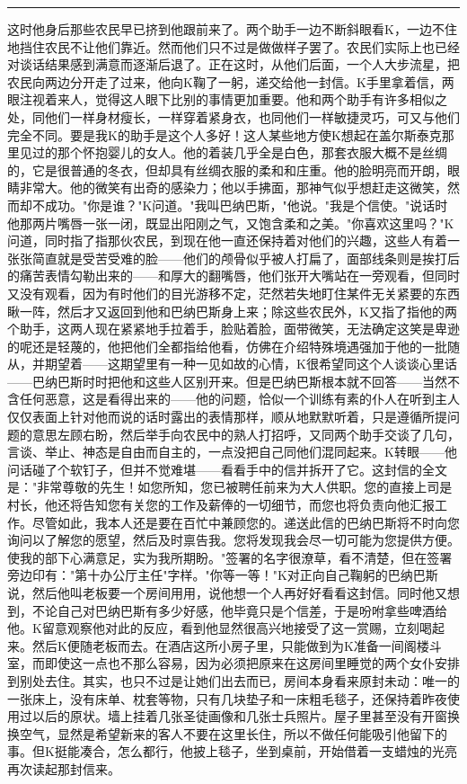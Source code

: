 \documentclass[12pt,a4paper]{article}
\begin{document}
\noindent\rule{\textwidth}{0.4pt}

\vspace{0.3em}



这时他身后那些农民早已挤到他跟前来了。两个助手一边不断斜眼看K，一边不住地挡住农民不让他们靠近。然而他们只不过是做做样子罢了。农民们实际上也已经对谈话结果感到满意而逐渐后退了。正在这时，从他们后面，一个人大步流星，把农民向两边分开走了过来，他向K鞠了一躬，递交给他一封信。K手里拿着信，两眼注视着来人，觉得这人眼下比别的事情更加重要。他和两个助手有许多相似之处，同他们一样身材瘦长，一样穿着紧身衣，也同他们一样敏捷灵巧，可又与他们完全不同。要是我K的助手是这个人多好！这人某些地方使K想起在盖尔斯泰克那里见过的那个怀抱婴儿的女人。他的着装几乎全是白色，那套衣服大概不是丝绸的，它是很普通的冬衣，但却具有丝绸衣服的柔和和庄重。他的脸明亮而开朗，眼睛非常大。他的微笑有出奇的感染力；他以手拂面，那神气似乎想赶走这微笑，然而却不成功。"你是谁？"K问道。"我叫巴纳巴斯，"他说。"我是个信使。"说话时他那两片嘴唇一张一闭，既显出阳刚之气，又饱含柔和之美。"你喜欢这里吗？"K问道，同时指了指那伙农民，到现在他一直还保持着对他们的兴趣，这些人有着一张张简直就是受苦受难的脸——他们的颅骨似乎被人打扁了，面部线条则是挨打后的痛苦表情勾勒出来的——和厚大的翻嘴唇，他们张开大嘴站在一旁观看，但同时又没有观看，因为有时他们的目光游移不定，茫然若失地盯住某件无关紧要的东西瞅一阵，然后才又返回到他和巴纳巴斯身上来；除这些农民外，K又指了指他的两个助手，这两人现在紧紧地手拉着手，脸贴着脸，面带微笑，无法确定这笑是卑逊的呢还是轻蔑的，他把他们全都指给他看，仿佛在介绍特殊境遇强加于他的一批随从，并期望着——这期望里有一种一见如故的心情，K很希望同这个人谈谈心里话——巴纳巴斯时时把他和这些人区别开来。但是巴纳巴斯根本就不回答——当然不含任何恶意，这是看得出来的——他的问题，恰似一个训练有素的仆人在听到主人仅仅表面上针对他而说的话时露出的表情那样，顺从地默默听着，只是遵循所提问题的意思左顾右盼，然后举手向农民中的熟人打招呼，又同两个助手交谈了几句，言谈、举止、神态是自由而自主的，一点没把自己同他们混同起来。K转眼——他问话碰了个软钉子，但并不觉难堪——看看手中的信并拆开了它。这封信的全文是："非常尊敬的先生！如您所知，您已被聘任前来为大人供职。您的直接上司是村长，他还将告知您有关您的工作及薪俸的一切细节，而您也将负责向他汇报工作。尽管如此，我本人还是要在百忙中兼顾您的。递送此信的巴纳巴斯将不时向您询问以了解您的愿望，然后及时禀告我。您将发现我会尽一切可能为您提供方便。使我的部下心满意足，实为我所期盼。"签署的名字很潦草，看不清楚，但在签署旁边印有："第十办公厅主任"字样。"你等一等！"K对正向自己鞠躬的巴纳巴斯说，然后他叫老板要一个房间用用，说他想一个人再好好看看这封信。同时他又想到，不论自己对巴纳巴斯有多少好感，他毕竟只是个信差，于是吩咐拿些啤酒给他。K留意观察他对此的反应，看到他显然很高兴地接受了这一赏赐，立刻喝起来。然后K便随老板而去。在酒店这所小房子里，只能做到为K准备一间阁楼斗室，而即使这一点也不那么容易，因为必须把原来在这房间里睡觉的两个女仆安排到别处去住。其实，也只不过是让她们出去而已，房间本身看来原封未动：唯一的一张床上，没有床单、枕套等物，只有几块垫子和一床粗毛毯子，还保持着昨夜使用过以后的原状。墙上挂着几张圣徒画像和几张士兵照片。屋子里甚至没有开窗换换空气，显然是希望新来的客人不要在这里长住，所以不做任何能吸引他留下的事。但K挺能凑合，怎么都行，他披上毯子，坐到桌前，开始借着一支蜡烛的光亮再次读起那封信来。
\end{document}
